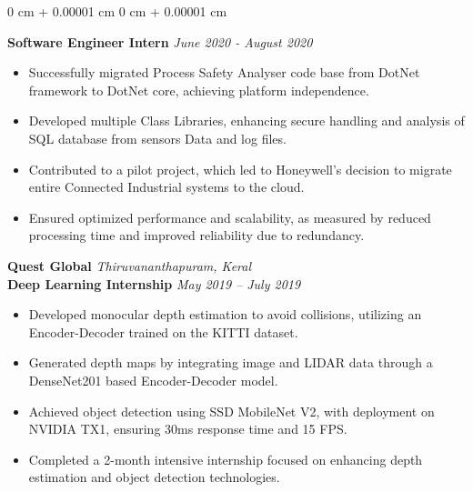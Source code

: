 \documentclass[10pt, letterpaper]{article}
\newenvironment{highlights}{
    \begin{itemize}[
        topsep=0.03 cm,
        parsep=0.02 cm,
        partopsep=0pt,
        itemsep=0pt,
        leftmargin=0 cm + 5pt
    ]
}{
    \end{itemize}
} %
\newenvironment{onecolentry}{
    \begin{adjustwidth}{
        0 cm + 0.00001 cm
    }{
        0 cm + 0.00001 cm
    }
}{
    \end{adjustwidth}
} %
\begin{document}
\begin{onecolentry}
            \vspace{0.2 cm}
            \textbf{\normalsize Software Engineer Intern} \hfill \textit{June 2020 -  August 2020} \\ %
            \begin{adjustwidth}{0.4cm}{0cm}
                \begin{highlights}
                    \item Successfully migrated Process Safety Analyser code base from DotNet framework to DotNet core, achieving platform independence.
                    \item Developed multiple Class Libraries, enhancing secure handling and analysis of SQL database from sensors Data and log files.
                    \item Contributed to a pilot project, which led to Honeywell's decision to migrate entire Connected Industrial systems to the cloud.
                    \item Ensured optimized performance and scalability, as measured by reduced processing time and improved reliability due to redundancy.
                \end{highlights}
            \end{adjustwidth}

            \vspace{0.2 cm}
            \textbf{\large  Quest Global} \hfill \textit{Thiruvananthapuram, Keral} \\  
            \textbf{Deep Learning Internship} \hfill \textit{May 2019 – July 2019}  \\  
            \begin{adjustwidth}{0.4cm}{0cm}
                \begin{highlights}
                    \item Developed monocular depth estimation to avoid collisions, utilizing an Encoder-Decoder trained on the KITTI dataset.
                    \item Generated depth maps by integrating image and LIDAR data through a DenseNet201 based Encoder-Decoder model.
                    \item Achieved object detection using SSD MobileNet V2, with deployment on NVIDIA TX1, ensuring 30ms response time and 15 FPS.
                    \item Completed a 2-month intensive internship focused on enhancing depth estimation and object detection technologies.
                \end{highlights}
            \end{adjustwidth}


\end{onecolentry}
\end{document}
